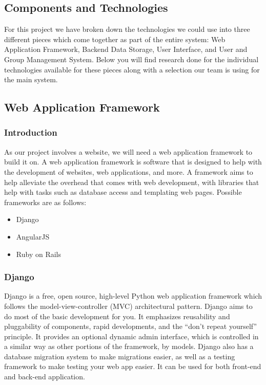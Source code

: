 \documentclass[draftclsnofoot,10pt,onecolumn]{IEEEtran} %
\begin{document}
\subsection{Components and Technologies}
For this project we have broken down the technologies we could use into three different pieces which come together as part
of the entire system: Web Application Framework, Backend Data Storage, User Interface, and User and Group Management
System. Below you will find research done for the individual technologies available for these pieces along with a selection
our team is using for the main system. 

\subsection{Web Application Framework}

\subsubsection{Introduction}
As our project involves a website, we will need a web application framework to build it on. A web application framework is
software that is designed to help with the development of websites, web applications, and more. A framework aims to help
alleviate the overhead that comes with web development, with libraries that help with tasks such as database access and
templating web pages. Possible frameworks are as follows: \\

	\begin{itemize}
		\item Django
		\item AngularJS
		\item Ruby on Rails \\
	\end{itemize}
	
\subsubsection{Django}
Django is a free, open source, high-level Python web application framework which follows the model-view-controller
(MVC) architectural pattern. Django aims to do most of the basic development for you. It emphasizes reusability and
pluggability of components, rapid developments, and the “don’t repeat yourself” principle. It provides an optional dynamic
admin interface, which is controlled in a similar way as other portions of the framework, by models. Django also has a
database migration system to make migrations easier, as well as a testing framework to make testing your web app easier. It
can be used for both front-end and back-end application. \\
\end{document}
